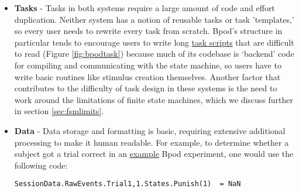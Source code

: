 \begin{itemize}[resume*, before=\vspace{0pt}, after=\vspace{\baselineskip}]%
    \item \textbf{Tasks} - Tasks in both systems require a large amount of code and effort duplication. Neither system has a notion of reusable tasks or task 'templates,' so every user needs to rewrite every task from scratch. Bpod's structure in particular tends to encourage users to write long \href{https://github.com/sanworks/Bpod_Gen2/blob/df6cd0c7d5df8247b02077b05fc263f79b86b096/Examples/Protocols/Sound/AnalogSound2AFC/AnalogSound2AFC.m}{task scripts} that are difficult to read (Figure \ref{fig:bpodtask}) because much of its codebase is `backend' code for compiling and communicating with the state machine, so users have to write basic routines like stimulus creation themselves. Another factor that contributes to the difficulty of task design in these systems is the need to work around the limitations of finite state machines, which we discuss further in section \ref{sec:fsmlimits}.
    \item \textbf{Data} - Data storage and formatting is basic, requiring extensive additional processing to make it human readable. For example, to determine whether a subject got a trial correct in an \href{https://github.com/sanworks/Bpod_Gen2/blob/master/Examples/Protocols/Light/Light2AFC/Light2AFC.m}{example} Bpod experiment, one would use the following code:
    
    \texttt{SessionData.RawEvents.Trial{1,1}.States.Punish(1) ~= NaN}
    

\end{itemize}
